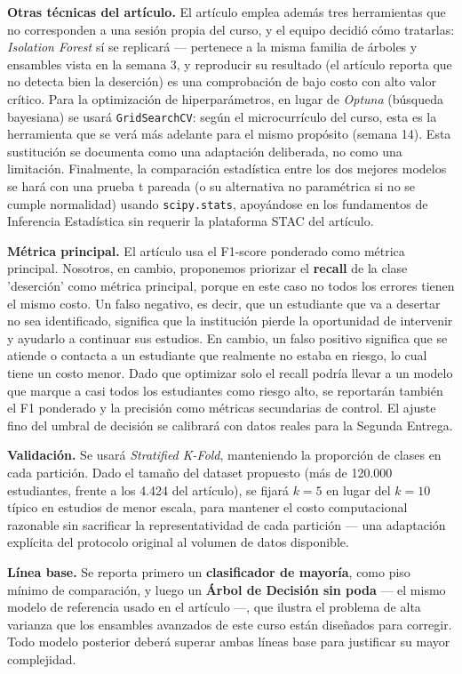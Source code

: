 \documentclass[11pt,a4paper]{article}
\begin{document}
\textbf{Otras técnicas del artículo.} El artículo emplea además tres herramientas que no corresponden a una sesión propia del curso, y el equipo decidió cómo tratarlas: \textit{Isolation Forest} sí se replicará --- pertenece a la misma familia de árboles y ensambles vista en la semana 3, y reproducir su resultado (el artículo reporta que no detecta bien la deserción) es una comprobación de bajo costo con alto valor crítico. Para la optimización de hiperparámetros, en lugar de \textit{Optuna} (búsqueda bayesiana) se usará \texttt{GridSearchCV}: según el microcurrículo del curso, esta es la herramienta que se verá más adelante para el mismo propósito (semana 14). Esta sustitución se documenta como una adaptación deliberada, no como una limitación. Finalmente, la comparación estadística entre los dos mejores modelos se hará con una prueba t pareada (o su alternativa no paramétrica si no se cumple normalidad) usando \texttt{scipy.stats}, apoyándose en los fundamentos de Inferencia Estadística sin requerir la plataforma STAC del artículo.

\textbf{Métrica principal.} El artículo usa el F1-score ponderado como métrica principal. Nosotros, en cambio, proponemos priorizar el \textbf{recall} de la clase 'deserción' como métrica principal, porque en este caso no todos los errores tienen el mismo costo. Un falso negativo, es decir, que un estudiante que va a desertar no sea identificado, significa que la institución pierde la oportunidad de intervenir y ayudarlo a continuar sus estudios. En cambio, un falso positivo significa que se atiende o contacta a un estudiante que realmente no estaba en riesgo, lo cual tiene un costo menor. Dado que optimizar solo el recall podría llevar a un modelo que marque a casi todos los estudiantes como riesgo alto, se reportarán también el F1 ponderado y la precisión como métricas secundarias de control. El ajuste fino del umbral de decisión se calibrará con datos reales para la Segunda Entrega.

\textbf{Validación.} Se usará \textit{Stratified K-Fold}, manteniendo la proporción de clases en cada partición. Dado el tamaño del dataset propuesto (más de 120.000 estudiantes, frente a los 4.424 del artículo), se fijará $k=5$ en lugar del $k=10$ típico en estudios de menor escala, para mantener el costo computacional razonable sin sacrificar la representatividad de cada partición --- una adaptación explícita del protocolo original al volumen de datos disponible.

\textbf{Línea base.} Se reporta primero un \textbf{clasificador de mayoría}, como piso mínimo de comparación, y luego un \textbf{Árbol de Decisión sin poda} --- el mismo modelo de referencia usado en el artículo ---, que ilustra el problema de alta varianza que los ensambles avanzados de este curso están diseñados para corregir. Todo modelo posterior deberá superar ambas líneas base para justificar su mayor complejidad.
\end{document}
